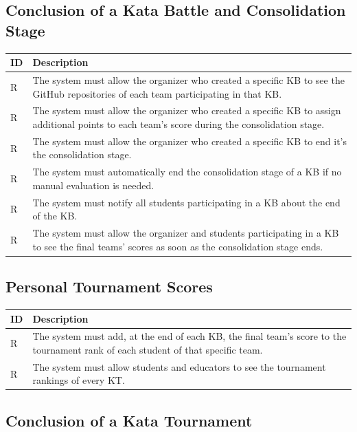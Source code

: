 \documentclass[11pt]{report}
\newcounter{rcounter}
\newcommand{\rc}{
    \addtocounter{rcounter}{1}
    R\arabic{rcounter}
}
\begin{document}
\subsection*{Conclusion of a Kata Battle and Consolidation Stage}

\begin{longtable}[h] {|p{10mm}|p{130mm}|}
    \hline
    \rowcolor{gray!20}
    \textbf{ID} & \textbf{Description} \\ \hline
    \rc & The system must allow the organizer who created a specific KB to see the GitHub repositories of each team participating in that KB\@.
    \\ \hline
    \rc & The system must allow the organizer who created a specific KB to assign additional points to each team's score during the consolidation stage.
    \\ \hline
    \rc & The system must allow the organizer who created a specific KB to end it's the consolidation stage.
    \\ \hline
    \rc & The system must automatically end the consolidation stage of a KB if no manual evaluation is needed.
    \\ \hline
    \rc & The system must notify all students participating in a KB about the end of the KB\@.
    \\ \hline
    \rc & The system must allow the organizer and students participating in a KB to see the final teams' scores as soon as the consolidation stage ends.
    \\ \hline
\end{longtable}

\subsection*{Personal Tournament Scores}

\begin{longtable}[h] {|p{10mm}|p{130mm}|}
    \hline
    \rowcolor{gray!20}
    \textbf{ID} & \textbf{Description} \\ \hline
    \rc & The system must add, at the end of each KB, the final team's score to the tournament rank of each student of that specific team.
    \\ \hline
    \rc & The system must allow students and educators to see the tournament rankings of every KT\@.
    \\ \hline
\end{longtable}

\subsection*{Conclusion of a Kata Tournament}
\end{document}
